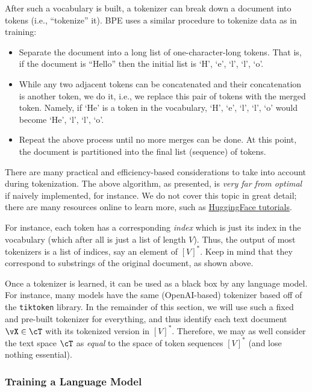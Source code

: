 \documentclass[\toplevelprefix/book-main.tex]{subfiles}
\begin{document}
After such a vocabulary is built, a tokenizer can break down a document into tokens (i.e., ``tokenize'' it). BPE uses a similar procedure to tokenize data as in training:
\begin{itemize}
    \item Separate the document into a long list of one-character-long tokens. That is, if the document is ``Hello'' then the initial list is `H', `e', `l', `l', `o'. 
    \item While any two adjacent tokens can be concatenated and their concatenation is another token, we do it, i.e., we replace this pair of tokens with the merged token. Namely, if `He' is a token in the vocabulary, `H', `e', `l', `l', `o' would become `He', `l', `l', `o'.
    \item Repeat the above process until no more merges can be done. At this point, the document is partitioned into the final list (sequence) of tokens.
\end{itemize}

There are many practical and efficiency-based considerations to take into account during tokenization. The above algorithm, as presented, is \textit{very far from optimal} if naively implemented, for instance. We do not cover this topic in great detail; there are many resources online to learn more, such as \href{https://huggingface.co/learn/nlp-course/en/chapter6/5}{HuggingFace tutorials}.

For instance, each token has a corresponding \textit{index} which is just its index in the vocabulary (which after all is just a list of length \(V\)). Thus, the output of most tokenizers is a list of indices, say an element of \([V]^{*}\). Keep in mind that they correspond to substrings of the original document, as shown above.

Once a tokenizer is learned, it can be used as a black box by any language model. For instance, many models have the same (OpenAI-based) tokenizer based off of the \texttt{tiktoken} library. In the remainder of this section, we will use such a fixed and pre-built tokenizer for everything, and thus identify each text document \(\vX \in \cT\) with its tokenized version in \([V]^{*}\). Therefore, we may as well consider the text space \(\cT\) as \textit{equal} to the space of token sequences \([V]^{*}\) (and lose nothing essential).

\subsubsection{Training a Language Model}
\end{document}
